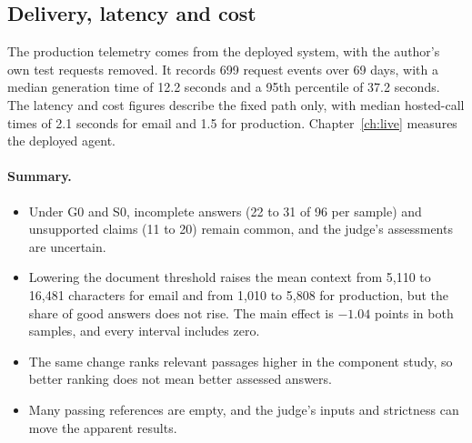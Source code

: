 \subsection{Delivery, latency and cost}

The production telemetry comes from the deployed system, with the author's own test requests removed. It records 699 request events over 69 days, with a median generation time of 12.2 seconds and a 95th percentile of 37.2 seconds. The latency and cost figures describe the fixed path only, with median hosted-call times of 2.1 seconds for email and 1.5 for production. Chapter~\ref{ch:live} measures the deployed agent.

\paragraph{Summary.}
\begin{itemize}
  \item Under G0 and S0, incomplete answers (22 to 31 of 96 per sample) and unsupported claims (11 to 20) remain common, and the judge's assessments are uncertain.
  \item Lowering the document threshold raises the mean context from 5,110 to 16,481 characters for email and from 1,010 to 5,808 for production, but the share of good answers does not rise. The main effect is $-1.04$ points in both samples, and every interval includes zero.
  \item The same change ranks relevant passages higher in the component study, so better ranking does not mean better assessed answers.
  \item Many passing references are empty, and the judge's inputs and strictness can move the apparent results.
\end{itemize}
